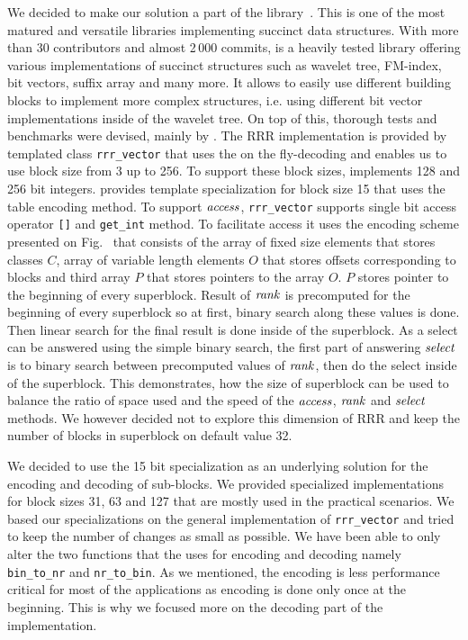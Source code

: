 We decided to make our solution a part of the \sdsl library~\citep{gog2014theory}. This
is one of the most matured and versatile libraries implementing succinct data structures.
With more than 30 contributors and almost 2\,000 commits, \sdsl is a heavily tested library
offering various implementations of succinct structures such as wavelet tree, FM-index,
bit vectors, suffix array and many more. It allows to easily use different building blocks
to implement more complex structures, i.e. using different bit vector implementations inside
of the wavelet tree. On top of this, thorough tests and benchmarks were devised, mainly by
\cite{gog2014optimized}. The RRR implementation is provided by templated class \texttt{rrr\_vector}
that uses the on the fly-decoding and enables us to use block size from 3 up to 256. To support
these block sizes, \sdsl implements 128 and 256 bit integers. \sdsl provides template
specialization for block size 15 that uses the table encoding method. To support $\mathit{access}$,
\texttt{rrr\_vector} supports single bit access operator \texttt{[]} and \texttt{get\_int} method.
To facilitate access it uses the encoding scheme presented on Fig.~\label{obr:RRRFinal} that
consists of the array of fixed size elements that stores classes $C$, array of variable length
elements $O$ that stores offsets corresponding to blocks and third array $P$ that stores pointers
to the array $O$. $P$ stores pointer to the beginning of every superblock. Result of $\mathit{rank}$ is
precomputed for the beginning of every superblock so at first, binary search along these values
is done. Then linear search for the final result is done inside of the superblock. As a select
can be answered using the simple binary search, the first part of answering $\mathit{select}$ is to
binary search between precomputed values of $\mathit{rank}$, then do the select inside of the superblock.
This demonstrates, how the size of superblock can be used to balance the ratio of space used and the
speed of the $\mathit{access}$, $\mathit{rank}$ and $\mathit{select}$ methods. We however decided not to explore this dimension
of RRR and keep the number of blocks in superblock on default value 32.

We decided to use the 15 bit specialization as an underlying solution for the encoding and decoding of
sub-blocks. We provided specialized implementations for block sizes 31, 63 and 127 that are mostly used
in the practical scenarios. We based our specializations on the general implementation of
\texttt{rrr\_vector} and tried to keep the number of changes as small as possible. We have been able
to only alter the two functions that the \sdsl uses for encoding and decoding namely \texttt{bin\_to\_nr}
and \texttt{nr\_to\_bin}. As we mentioned, the encoding is less performance critical for most of the
applications as encoding is done only once at the beginning. This is why we focused more on the
decoding part of the implementation.

